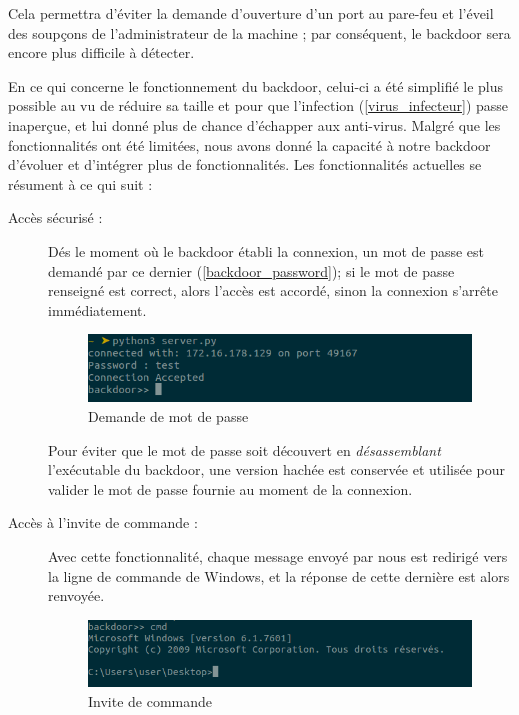         Cela permettra d'éviter la demande
        d'ouverture d'un port au pare-feu et l'éveil des soupçons de l'administrateur de la machine ; 
        par conséquent, le backdoor sera encore plus difficile à détecter.%

        En ce qui concerne le fonctionnement du backdoor, celui-ci a été simplifié le plus possible au vu de réduire 
        sa taille et pour que l'infection (\autoref{virus_infecteur}) passe inaperçue, et lui donné plus de 
        chance d'échapper aux anti-virus. 
        Malgré que les fonctionnalités ont été limitées, nous avons donné la capacité à notre backdoor 
        d'évoluer et d’intégrer plus de fonctionnalités.
        Les fonctionnalités actuelles se résument à ce qui suit : 

        \begin{description}
            \item[Accès sécurisé :] Dés le moment où le backdoor établi la connexion, un mot de passe est
                demandé par ce dernier (\autoref{backdoor_password}); si le mot de passe renseigné est correct, 
                alors l'accès est accordé, sinon la connexion s'arrête immédiatement. %

                \begin{figure}[h!]
                    \centering
                    \includegraphics[width=0.9\linewidth]{images/backdoor_password.png}
                    \caption{Demande de mot de passe}
                    \label{backdoor_password}
                \end{figure}

                Pour éviter que le mot de passe soit découvert en \emph{désassemblant} l'exécutable du backdoor,
                une version hachée est conservée et utilisée pour valider le mot de passe fournie au moment de la 
                connexion. %

            \item[Accès à l'invite de commande :] Avec cette fonctionnalité, 
                chaque message envoyé par nous est redirigé vers la ligne 
                de commande de Windows, et la réponse de cette dernière est alors renvoyée.
                \begin{figure}[h!]
                    \centering
                    \includegraphics[width=0.9\linewidth]{images/backdoor_cmd.png}
                    \caption{Invite de commande}
                    \label{backdoor_cmd}
                \end{figure}


\end{description}
